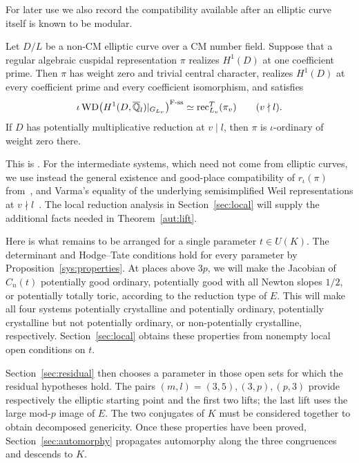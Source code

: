 For later use we also record the compatibility available after an elliptic
curve itself is known to be modular.

\begin{theorem}
\label{aut:elliptic-compat}
Let $D/L$ be a non-CM elliptic curve over a CM number field. Suppose that a
regular algebraic cuspidal representation $\pi$ realizes $H^1(D)$ at one
coefficient prime. Then $\pi$ has weight zero and trivial central character,
realizes $H^1(D)$ at every coefficient prime and every coefficient
isomorphism, and satisfies
\[
 \iota\operatorname{WD}\bigl(H^1(D,\overline{\mathbb Q}_l)|_{G_{L_v}}\bigr)^{\mathrm{F\text{-}ss}}
 \simeq\operatorname{rec}^T_{L_v}(\pi_v)\qquad(v\nmid l).
\]
If $D$ has potentially multiplicative reduction at $v\mid l$, then $\pi$
is $\iota$-ordinary of weight zero there.
\end{theorem}

This is \cite[Lemma~6.1.3]{CN}. For the intermediate systems, which need not
come from elliptic curves, we use instead the general existence and
good-place compatibility of $r_\iota(\pi)$ from~\cite{HLTT,Scholze}, and
Varma's equality of the underlying semisimplified Weil representations at
$v\nmid l$~\cite[Theorem~1]{Varma}. The local reduction analysis in
Section~\ref{sec:local} will supply the additional facts needed in
Theorem~\ref{aut:lift}.

Here is what remains to be arranged for a single parameter $t\in U(K)$.
The determinant and Hodge--Tate conditions hold for every parameter by
Proposition~\ref{sys:properties}. At places above $3p$, we will make the
Jacobian of $C_n(t)$ potentially good ordinary, potentially good with all
Newton slopes $1/2$, or potentially totally toric, according to the
reduction type of $E$. This will make all four systems potentially
crystalline and potentially ordinary, potentially crystalline but not potentially ordinary, or
non-potentially crystalline, respectively. Section~\ref{sec:local} obtains
these properties from nonempty local open conditions on $t$.

Section~\ref{sec:residual} then chooses a parameter in those open sets for
which the residual hypotheses hold. The pairs $(m,l)=(3,5),(3,p),(p,3)$
provide respectively the elliptic starting point and the first two lifts;
the last lift uses the large mod-$p$ image of $E$. The two conjugates of
$K$ must be considered together to obtain decomposed genericity. Once
these properties have been proved, Section~\ref{sec:automorphy} propagates
automorphy along the three congruences and descends to $K$.
